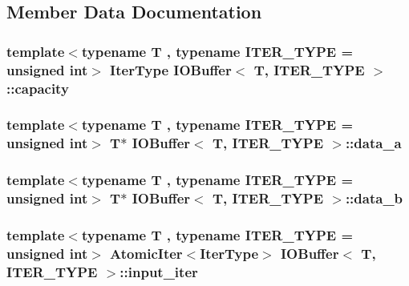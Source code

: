 \subsection{Member Data Documentation}
\hypertarget{structIOBuffer_a185b9d6fdaa3f937f5b97d18ae813c08}{
\subsubsection[{capacity}]{\setlength{\rightskip}{0pt plus 5cm}template$<$typename T , typename I\-T\-E\-R\-\_\-\-T\-Y\-P\-E  = unsigned int$>$ {\bf Iter\-Type} {\bf I\-O\-Buffer}$<$ T, I\-T\-E\-R\-\_\-\-T\-Y\-P\-E $>$\-::capacity}}\label{structIOBuffer_a185b9d6fdaa3f937f5b97d18ae813c08}
\hypertarget{structIOBuffer_a64e70fb67768e01a6620bc8ad7964ab0}{
\subsubsection[{data\-\_\-a}]{\setlength{\rightskip}{0pt plus 5cm}template$<$typename T , typename I\-T\-E\-R\-\_\-\-T\-Y\-P\-E  = unsigned int$>$ T$\ast$ {\bf I\-O\-Buffer}$<$ T, I\-T\-E\-R\-\_\-\-T\-Y\-P\-E $>$\-::data\-\_\-a}}\label{structIOBuffer_a64e70fb67768e01a6620bc8ad7964ab0}
\hypertarget{structIOBuffer_a3c49c40193c6906e051eb89b128ab00f}{
\subsubsection[{data\-\_\-b}]{\setlength{\rightskip}{0pt plus 5cm}template$<$typename T , typename I\-T\-E\-R\-\_\-\-T\-Y\-P\-E  = unsigned int$>$ T$\ast$ {\bf I\-O\-Buffer}$<$ T, I\-T\-E\-R\-\_\-\-T\-Y\-P\-E $>$\-::data\-\_\-b}}\label{structIOBuffer_a3c49c40193c6906e051eb89b128ab00f}
\hypertarget{structIOBuffer_a76c5930fc902839c06f6dc78b4ad9556}{
\subsubsection[{input\-\_\-iter}]{\setlength{\rightskip}{0pt plus 5cm}template$<$typename T , typename I\-T\-E\-R\-\_\-\-T\-Y\-P\-E  = unsigned int$>$ {\bf Atomic\-Iter}$<${\bf Iter\-Type}$>$ {\bf I\-O\-Buffer}$<$ T, I\-T\-E\-R\-\_\-\-T\-Y\-P\-E $>$\-::input\-\_\-iter}}\label{structIOBuffer_a76c5930fc902839c06f6dc78b4ad9556}
